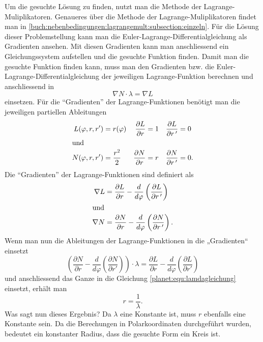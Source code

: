 Um die gesuchte Lösung zu finden, nutzt man die Methode der Lagrange-Muliplika\-to\-ren.
Genaueres über die Methode der Lagrange-Muliplika\-to\-ren findet man in \cref{buch:nebenbedingungen:lagrangemult:subsection:einzeln}.
%
%
Für die Lösung dieser Problemstellung kann man die Euler-Lagrange-Dif\-fe\-ren\-ti\-al\-glei\-chung als Gradienten ansehen.
Mit diesen Gradienten kann man anschliessend ein Gleichungssystem aufstellen und die gesuchte Funktion finden.
Damit man die gesuchte Funktion finden kann, muss man den Gradienten bzw. die Euler-Lagrange-Differentialgleichung der jeweiligen Lagrange-Funktion berechnen und anschliessend in
\begin{equation}
	\nabla N \cdot \lambda = \nabla L
	\label{planet:equ:lamdagleichung}
\end{equation}
einsetzen.
Für die ``Gradienten'' der Lagrange-Funktionen benötigt man die jeweiligen partiellen Ableitungen
%
\begin{align*}
	L(\varphi ,r,r') &= r(\varphi)& \frac{\partial L}{\partial r} &= 1& \frac{\partial L}{\partial r\,'} &= 0 \\
\intertext{und}
	N(\varphi ,r,r') &= \frac{r^2}{2}& \frac{\partial N}{\partial r} &= r& \frac{\partial N}{\partial r\,'} &= 0.
\end{align*}
Die ``Gradienten'' der Lagrange-Funktionen sind definiert als 
\begin{align*}
	\nabla L &= \frac{\partial L}{\partial r} - \frac{d}{d\varphi}\left(\frac{\partial L}{\partial r\,'} \right)\\
\intertext{und}
	\nabla N &= \frac{\partial N}{\partial r} - \frac{d}{d\varphi}\left(\frac{\partial N}{\partial r\,'} \right).
\end{align*}
Wenn man nun die Ableitungen der Lagrange-Funktionen in die „Gradienten“ einsetzt
\begin{equation*}
	\left(\frac{\partial N}{\partial r} - \frac{d}{d\varphi}\left(\frac{\partial N}{\partial r'}\right)\right)\cdot \lambda = \frac{\partial L}{\partial r}-  \frac{d}{d\varphi}\left( \frac{\partial L}{\partial r'} \right)
\end{equation*} 
und anschliessend das Ganze in die Gleichung \eqref{planet:equ:lamdagleichung} einsetzt, erhält man
\begin{equation*}
	r = \frac{1}{\lambda}.
\end{equation*}
Was sagt nun dieses Ergebnis?
Da \(\lambda\) eine Konstante ist, muss \(r\) ebenfalls eine Konstante sein.
Da die Berechungen in Polarkoordinaten durchgeführt wurden, bedeutet ein konstanter Radius, dass die gesuchte Form ein Kreis ist.


